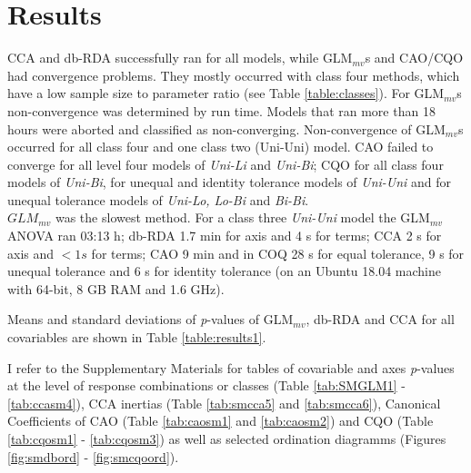 
 
\section{Results}


	
		CCA and db-RDA successfully ran for all models, while GLM$_{mv}$s and CAO/CQO had convergence problems. 
		They mostly occurred with class four methods, which have a low sample size to parameter ratio (see Table \ref{table:classes}). 
		For GLM$_{mv}$s non-convergence was determined by run time. 
		Models that ran more than 18 hours were aborted and classified as non-converging.
		Non-convergence of GLM$_{mv}$s occurred for all class four and one class two (Uni-Uni) model. 
		CAO failed to converge for all level four models of \textit{Uni-Li} and \textit{Uni-Bi}; CQO for  all class four models of \textit{Uni-Bi}, for unequal and identity tolerance models of \textit{Uni-Uni} and for unequal tolerance models of \textit{Uni-Lo, Lo-Bi} and \textit{Bi-Bi}.\\

	
		$GLM_{mv}$ was the slowest method. 
		For a class three \textit{Uni-Uni} model the GLM$_{mv}$ ANOVA ran 03:13 h;
		db-RDA 1.7 min for axis and 4 s for terms; 
		CCA 2 s for axis and $< 1s $ for terms; 
		CAO 9 min  and in COQ 28 s for equal tolerance, 9 s for unequal tolerance and 6 s for identity tolerance (on an Ubuntu 18.04 machine with 64-bit, 8 GB RAM and 1.6 GHz).

	
		Means and standard deviations of \textit{p}-values of GLM$_{mv}$, db-RDA and CCA for all covariables are shown in Table \ref{table:results1}.
		
		I refer to the Supplementary Materials for tables of covariable and axes \textit{p}-values at the level of response combinations or classes (Table \ref{tab:SMGLM1} - \ref{tab:ccasm4}), CCA inertias (Table \ref{tab:smcca5} and \ref{tab:smcca6}), Canonical Coefficients of CAO (Table \ref{tab:caosm1} and \ref{tab:caosm2}) and CQO (Table \ref{tab:cqosm1} - \ref{tab:cqosm3}) as well as selected ordination diagramms (Figures \ref{fig:smdbord} - \ref{fig:smcqoord}).
		
